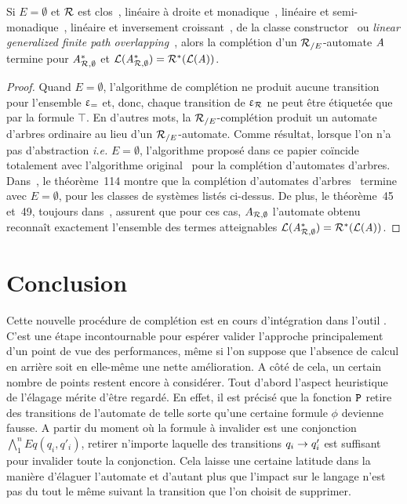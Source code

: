 \begin{theorem}
  \label{thm:regular}
  Si $E=\emptyset$ et $\mathcal R$ est clos~\cite{DauchetTison-LICS90,Brainerd-IC69}, linéaire à droite et
  monadique~\cite{Salomaa88}, linéaire et semi-monadique~\cite{CoquideDauchetGV-FCT89}, linéaire et inversement
  croissant~\cite{Jacquemard-RTA96}, de la classe constructor~\cite{Rety-LPAR99} ou \textit{linear generalized finite path
    overlapping~\cite{Takai-RTA04}}, alors la complétion d'un ${\mathcal R_{/E}}$-automate $\mathit A$ 
  termine pour $\mathit A_{\mathcal R,\emptyset}^*$ et $\mathcal{L}(\mathit A_{\mathcal R,\emptyset}^*)=\mathcal R^*(\mathcal{L}(\mathit A))$.
\end{theorem}

\begin{proof}
  Quand $E=\emptyset$, l'algorithme de complétion ne produit aucune transition
  pour l'ensemble $\upvarepsilon_{=}$ et, donc, chaque transition de $\upvarepsilon_{\mathcal R}$ ne peut être étiquetée 
  que par la formule $\top$. En d'autres mots, la ${\mathcal R_{/E}}$-complétion produit un automate d'arbres
  ordinaire au lieu d'un ${\mathcal R_{/E}}$-automate. Comme résultat, lorsque l'on n'a pas d'abstraction \textit{i.e.} $E=\emptyset$,
  l'algorithme proposé dans ce papier coïncide totalement avec l'algorithme original~\cite{GenetR-JSC10} 
  pour la complétion d'automates d'arbres. Dans~\cite{Genet-Habil}, le théorème~114 montre que
  la complétion d'automates d'arbres~\cite{GenetR-JSC10} termine avec $E=\emptyset$,
  pour les classes de systèmes listés ci-dessus. De plus, le théorème~45 et~49, toujours
  dans~\cite{GenetR-JSC10}, assurent que pour ces cas, $A_{\mathcal R,\emptyset}$ l'automate obtenu
  reconnaît exactement l'ensemble des termes atteignables $\mathcal{L}(\mathit A_{\mathcal R,\emptyset}^*)=\mathcal R^*(\mathcal{L}(\mathit A))$.
\end{proof}

\section{Conclusion}
Cette nouvelle procédure de complétion est en cours d'intégration dans l'outil \timbuk.
C'est une étape incontournable pour espérer valider l'approche principalement d'un point
de vue des performances, même si l'on suppose que l'absence de calcul en arrière soit
en elle-même une nette amélioration. A côté de cela, un certain nombre de points
restent encore à considérer.
Tout d'abord l'aspect heuristique de l'élagage mérite d'être regardé. En effet, 
il est précisé que la fonction $\mathtt{P}$ retire des transitions de l'automate de telle sorte
qu'une certaine formule $\phi$ devienne fausse. A partir du moment où la formule à invalider
est une conjonction $\bigwedge_1^n Eq(q_i,q'_i)$, retirer n'importe laquelle des transitions
$q_i \rightarrow q'_i$ est suffisant pour invalider toute la conjonction. Cela laisse une certaine
latitude dans la manière d'élaguer l'automate et d'autant plus que l'impact sur le langage
n'est pas du tout le même suivant la transition que l'on choisit de supprimer.

